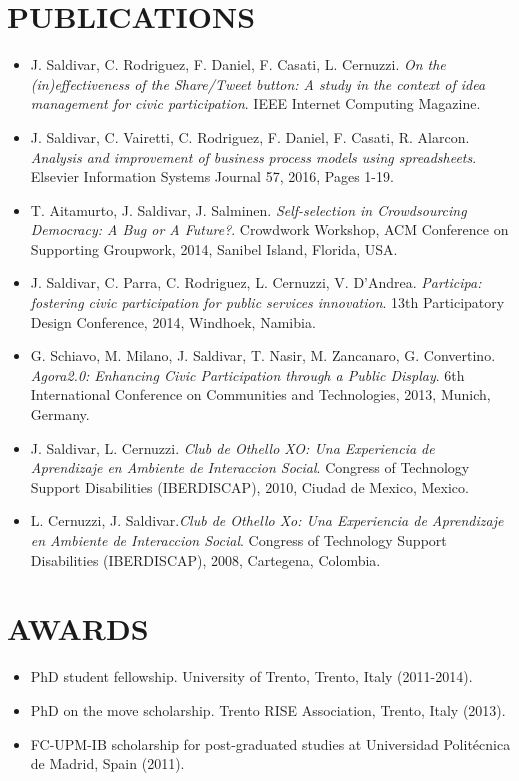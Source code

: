 \documentclass[line,margin]{res}
\begin{document}
\begin{resume}
\section{PUBLICATIONS}
\begin{itemize} \itemsep -2pt 
	\item J. Saldivar, C. Rodriguez, F. Daniel, F. Casati, L. Cernuzzi. \emph{On the (in)effectiveness of the Share/Tweet button: A study in the context of idea management for civic participation}. IEEE Internet Computing Magazine.
	\item J. Saldivar, C. Vairetti, C. Rodriguez, F. Daniel, F. Casati, R. Alarcon. \emph{Analysis and improvement of business process models using spreadsheets}. Elsevier Information Systems Journal 57, 2016, Pages 1-19.
	\item T. Aitamurto, J. Saldivar, J. Salminen. \emph{Self-selection in Crowdsourcing Democracy: A Bug or A Future?}. Crowdwork Workshop, ACM Conference on Supporting Groupwork, 2014, Sanibel Island, Florida, USA.
	\item J. Saldivar, C. Parra, C. Rodriguez, L. Cernuzzi, V. D'Andrea. \emph{Participa: fostering civic participation for public services innovation}. 13th Participatory Design Conference, 2014, Windhoek, Namibia.
	\item G. Schiavo, M. Milano, J. Saldivar, T. Nasir, M. Zancanaro, G. Convertino. \emph{Agora2.0: Enhancing Civic Participation through a Public Display}. 6th International Conference on Communities and Technologies, 2013, Munich, Germany.
	\item J. Saldivar, L. Cernuzzi. \emph{Club de Othello XO: Una Experiencia de Aprendizaje en Ambiente de Interaccion Social}. Congress of Technology Support Disabilities (IBERDISCAP), 2010, Ciudad de Mexico, Mexico.
	\item L. Cernuzzi, J. Saldivar.\emph{Club de Othello Xo: Una Experiencia de Aprendizaje en Ambiente de Interaccion Social}. Congress of Technology Support Disabilities (IBERDISCAP), 2008, Cartegena, Colombia.
\end{itemize}

\section{AWARDS}
\begin{itemize} \itemsep -2pt 
	\item PhD student fellowship. University of Trento, Trento, Italy (2011-2014).
	\item PhD on the move scholarship. Trento RISE Association, Trento, Italy (2013).
	\item FC-UPM-IB scholarship for post-graduated studies at Universidad Polit\'ecnica de Madrid, Spain (2011).
\end{itemize}


\end{resume}
\end{document}
